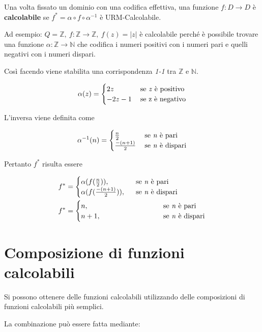 Una volta fissato un dominio con una codifica effettiva, una funzione
$f: D \rightarrow D$ è \textbf{calcolabile} se $f^* = \alpha \circ f \circ \alpha^{-1}$ è URM-Calcolabile.

Ad esempio: $Q = \mathbb{Z},\: f : \mathbb{Z} \rightarrow \mathbb{Z},\: f(z) =
|z|$ è calcolabile perché è possibile trovare una funzione $\alpha : \mathbb{Z}
\rightarrow \mathbb{N}$ che codifica i numeri positivi con i numeri pari e
quelli negativi con i numeri dispari.

Così facendo viene stabilita una corrispondenza \textit{1-1} tra $\mathbb{Z}$ e $\mathbb{N}$.


$$\alpha(z) = \begin{cases}
2z\:& \text{se \textit{z} è positivo} \\
-2z-1\:& \text{se z è negativo}
\end{cases}$$

L'inversa viene definita come

$$\alpha^{-1}(n) = \begin{cases} \frac{n}{2} \:& \text{se \textit{n} è pari}\\
 \frac{-(n+1)}{2}\:& \text{se \textit{n} è dispari}\end{cases}$$

Pertanto $f^*$ risulta essere

\begin{align*}
	f^* &=\begin{cases}
	\alpha(f(\frac{n}{2})), \:\:\:& \text{se \textit{n} è pari}\\
	\alpha(f(\frac{-(n+1)}{2})), \:\:\:& \text{se \textit{n} è dispari}
	\end{cases} \\	
	f^* &= \begin{cases}
	n, \qquad\qquad\qquad\qquad& \text{se \textit{n} è pari} \\
	n+1, \qquad\qquad\qquad\qquad& \text{se \textit{n} è dispari}
	\end{cases} 
\end{align*}


\chapter{Composizione di funzioni calcolabili}\label{composizione-di-funzioni-calcolabili}

Si possono ottenere delle funzioni calcolabili utilizzando delle
composizioni di funzioni calcolabili più semplici.

La combinazione può essere fatta mediante:

